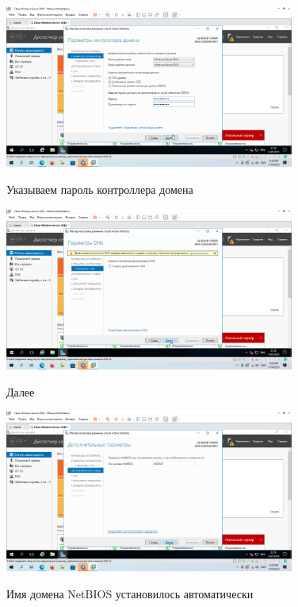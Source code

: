 \documentclass[a4paper]{article}
\begin{document}
  \begin{figure}[H]
    \centering
    \includegraphics[width=0.85\textwidth]{5_0046}
    \label{img:46}
    \caption{Указываем пароль контроллера домена}
  \end{figure}

  \begin{figure}[H]
    \centering
    \includegraphics[width=0.85\textwidth]{5_0047}
    \label{img:47}
    \caption{Далее}
  \end{figure}

  \begin{figure}[H]
    \centering
    \includegraphics[width=0.85\textwidth]{5_0048}
    \label{img:48}
    \caption{Имя домена NetBIOS установилось автоматически}
  \end{figure}
\end{document}
